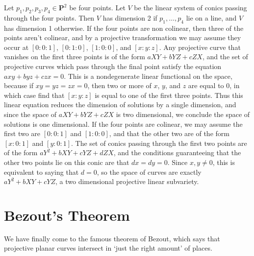 \begin{example}
    Let $p_1,p_2,p_3,p_4 \in \mathbf{P}^2$ be four points. Let $V$ be the linear system of conics passing through the four points. Then $V$ has dimension 2 if $p_1, \dots, p_4$ lie on a line, and $V$ has dimension 1 otherwise. If the four points are non colinear, then three of the points aren't colinear, and by a projective transformation we may assume they occur at $[0:0:1]$, $[0:1:0]$, $[1:0:0]$, and $[x:y:z]$. Any projective curve that vanishes on the first three points is of the form $aXY + bYZ + cZX$, and the set of projective curves which pass through the final point satisfy the equation $axy + byz + czx = 0$. This is a nondegenerate linear functional on the space, because if $xy = yz = zx = 0$, then two or more of $x$, $y$, and $z$ are equal to 0, in which case find that $[x:y:z]$ is equal to one of the first three points. Thus this linear equation reduces the dimension of solutions by a single dimension, and since the space of $aXY + bYZ + cZX$ is two dimensional, we conclude the space of solutions is one dimensional. If the four points are colinear, we may assume the first two are $[0:0:1]$ and $[1:0:0]$, and that the other two are of the form $[x:0:1]$ and $[y:0:1]$. The set of conics passing through the first two points are of the form $aY^2 + bXY + cYZ + dZX$, and the conditions guaranteeing that the other two points lie on this conic are that $dx = dy = 0$. Since $x,y \neq 0$, this is equivalent to saying that $d = 0$, so the space of curves are exactly $aY^2 + bXY + cYZ$, a two dimensional projective linear subvariety.
\end{example}

\section{Bezout's Theorem}

We have finally come to the famous theorem of Bezout, which says that projective planar curves intersect in `just the right amount' of places.

